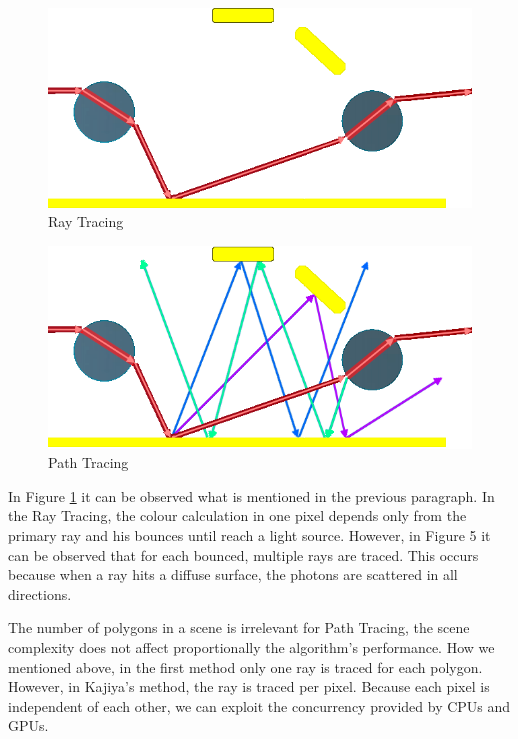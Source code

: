 \documentclass[titlepage,12pt]{report}
\begin{document}
\begin{figure}[!ht]
	\centering
	\includegraphics[scale=0.45]{media/lightPathRT.png}
	\caption{Ray Tracing}
	\label{RT_traced}
\end{figure}

\begin{figure}[!ht]
	\centering
	\includegraphics[scale=0.45]{media/lightPathPT.png}
	\caption{Path Tracing}
	\label{PT_traced}
\end{figure}

In Figure \ref{RT_traced} it can be observed what is mentioned in the previous paragraph. In the Ray Tracing, the colour calculation in one pixel depends only from the primary ray and his bounces until reach a light source. However, in Figure 5 it can be observed that for each bounced, multiple rays are traced. This occurs because when a ray hits a diffuse surface, the photons are scattered in all directions. 

The number of polygons in a scene is irrelevant for Path Tracing, the scene complexity does not affect proportionally the algorithm's performance. How we mentioned above, in the first method only one ray is traced for each polygon. However, in Kajiya's method, the ray is traced per pixel. Because each pixel is independent of each other, we can exploit the concurrency provided by CPUs and GPUs.
\end{document}
